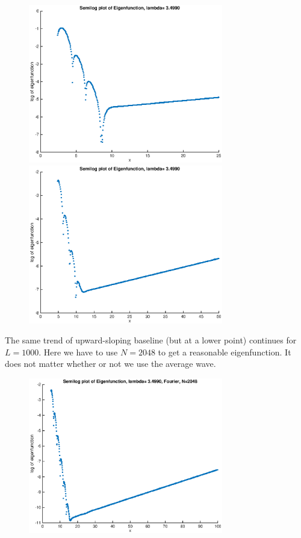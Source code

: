 \documentclass[12pt]{article}
\begin{document}
\begin{figure}[H]
\includegraphics[width=8.5cm]{1doublesemilogeigenfn}
\includegraphics[width=8.5cm]{1doublesemilogeigenfn50}
\end{figure}

The same trend of upward-sloping baseline (but at a lower point) continues for $L = 1000$. Here we have to use $N=2048$ to get a reasonable eigenfunction. It does not matter whether or not we use the average wave.

\begin{figure}[H]
\includegraphics[width=8.5cm]{1doublesemilogeigenfn100_2048}
\end{figure}
\end{document}
